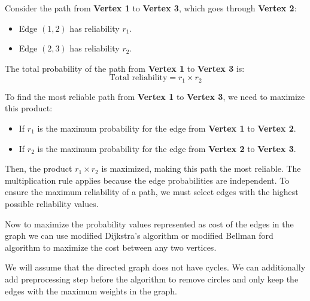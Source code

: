 \documentclass[11pt]{article}
\begin{document}
Consider the path from \textbf{Vertex 1} to \textbf{Vertex 3}, which goes through \textbf{Vertex 2}:

\begin{itemize}
    \item Edge \((1, 2)\) has reliability \( r_1 \).
    \item Edge \((2, 3)\) has reliability \( r_2 \).
\end{itemize}

The total probability of the path from \textbf{Vertex 1} to \textbf{Vertex 3} is:
\[
\text{Total reliability} = r_1 \times r_2
\]

To find the most reliable path from \textbf{Vertex 1} to \textbf{Vertex 3}, we need to maximize this product:

\begin{itemize}
    \item If \( r_1 \) is the maximum probability for the edge from \textbf{Vertex 1} to \textbf{Vertex 2}.
    \item If \( r_2 \) is the maximum probability for the edge from \textbf{Vertex 2} to \textbf{Vertex 3}.
\end{itemize}

Then, the product \( r_1 \times r_2 \) is maximized, making this path the most reliable. The multiplication rule applies because the edge probabilities are independent.
To ensure the maximum reliability of a path, we must select edges with the highest possible reliability values.

Now to maximize the probability values represented as cost of the edges in the graph we can use modified Dijkstra's algorithm or modified Bellman ford algorithm to maximize the cost between any two vertices. 

We will assume that the directed graph does not have cycles. We can additionally add preprocessing step before the algorithm to remove circles and only keep the edges with the maximum weights in the graph.
\end{document}
